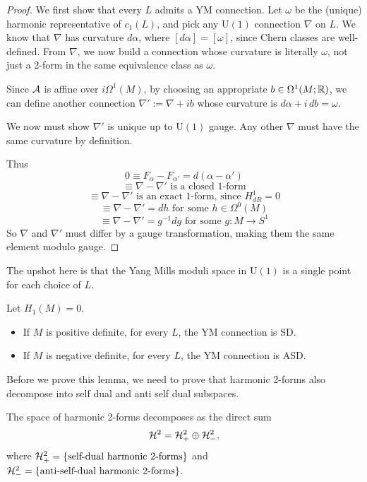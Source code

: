 \documentclass[main]{subfiles}
\begin{document}
\begin{proof}
We first show that every $L$ admits a YM connection. Let $\omega$ be the (unique) harmonic representative of $c_1(L)$, and pick any $\mathrm{U}(1)$ connection $\nabla$ on $L$. We know that $\nabla$ has curvature $d\alpha$, where $[d\alpha]=[\omega]$, since Chern classes are well-defined. From $\nabla$, we now build a connection whose curvature is literally $\omega$, not just a 2-form in the same equivalence class as $\omega$.

Since $\mathcal{A}$ is affine over $i\Omega^1(M)$, by choosing an appropriate $b\in\Omega^1(M;\mathbb R)$, we can define another connection $\nabla' := \nabla + ib$ whose curvature is $d\alpha + i\,db = \omega$.

We now must show $\nabla'$ is unique up to $\mathrm{U}(1)$ gauge. Any other $\nabla$ must have the same curvature by definition.

Thus
\[
0 \equiv F_\alpha - F_{\alpha'} = d(\alpha-\alpha')
\]
\[
\equiv \nabla-\nabla' \text{ is a closed 1-form}
\]
\[
\equiv \nabla-\nabla' \text{ is an exact 1-form, since } H^1_{dR}=0
\]
\[
\equiv \nabla-\nabla' = dh \text{ for some } h \in \Omega^0(M)
\]
\[
\equiv \nabla-\nabla' = g^{-1}dg \text{ for some } g:M\to S^1
\]
So $\nabla$ and $\nabla'$ must differ by a gauge transformation, making them the same element modulo gauge.
\end{proof}

The upshot here is that the Yang Mills moduli space in $\mathrm{U}(1)$ is a single point for each choice of $L$.

\begin{lemma}
Let $H_1(M)=0$.
\begin{itemize}
	\item If $M$ is positive definite, for every $L$, the YM connection is SD.
	\item If $M$ is negative definite, for every $L$, the YM connection is ASD.
\end{itemize}
\end{lemma}

Before we prove this lemma, we need to prove that harmonic 2-forms also decompose into self dual and anti self dual subspaces.

\begin{proposition}
The space of harmonic 2-forms decomposes as the direct sum
\[
\mathcal{H}^2 = \mathcal{H}^2_+ \oplus \mathcal{H}^2_-,
\]
where $\mathcal{H}^2_+ = \{\text{self-dual harmonic 2-forms}\}$ and $\mathcal{H}^2_- = \{\text{anti-self-dual harmonic 2-forms}\}$.
\end{proposition}
\end{document}
